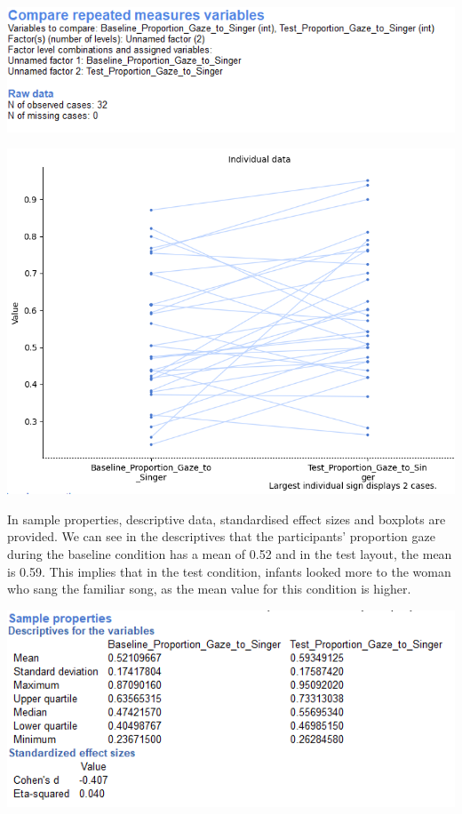 \documentclass[
]{book}
\begin{document}
\includegraphics{img/ch6/6.7comparerepeatedmeasures_info.png}

\includegraphics{img/ch6/6.7comparerepeatedmeasures_raw.png}

In sample properties, descriptive data, standardised effect sizes and boxplots are provided. We can see in the descriptives that the participants' proportion gaze during the baseline condition has a mean of 0.52 and in the test layout, the mean is 0.59. This implies that in the test condition, infants looked more to the woman who sang the familiar song, as the mean value for this condition is higher.

\includegraphics{img/ch6/6.7comparerepeatedmeasures_sampleprop.png}
\end{document}
